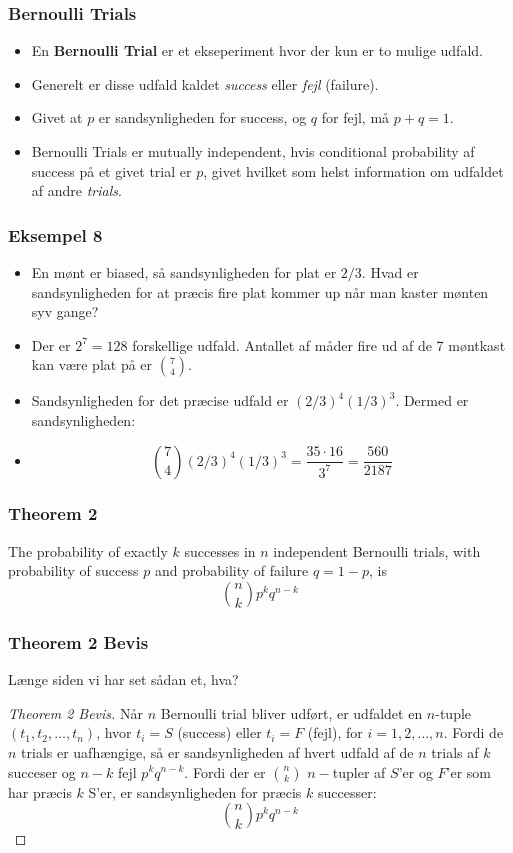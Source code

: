 \documentclass{beamer}
\begin{document}
\begin{frame}
  \frametitle{Bernoulli Trials}
 \begin{itemize}
 \item En \textbf{Bernoulli Trial} er et ekseperiment hvor der kun er to mulige udfald. 
 \item Generelt er disse udfald kaldet \textit{success} eller \textit{fejl} (failure). 
 \item Givet at $p$ er sandsynligheden for success, og $q$ for fejl, må $p + q = 1$.
 \item Bernoulli Trials er mutually independent, hvis conditional probability af success på et givet trial er $p$, givet hvilket som helst information om udfaldet af andre \textit{trials}.
 \end{itemize} 
\end{frame}

\begin{frame}
  \frametitle{Eksempel 8}
  \begin{itemize}
  \item<1-> En mønt er biased, så sandsynligheden for plat er $2/3$. Hvad er sandsynligheden for at præcis fire plat kommer up når man kaster mønten syv gange? 
  \item<2-> Der er $2^{7} = 128$  forskellige udfald. Antallet af måder fire ud af de 7 møntkast kan være plat på er $\binom{7}{4}$. 
  \item<2-> Sandsynligheden for det præcise udfald er $(2/3)^{4}(1/3)^{3}$. Dermed er sandsynligheden:
  \item<3-> \[ \binom{7}{4} (2/3)^{4} (1/3)^{3} = \frac{35 \cdot 16}{3^{7}} = \frac{560}{2187} \]
  \end{itemize}
\end{frame}

\begin{frame}
  \frametitle{Theorem 2}
  \begin{theorem}[Theorem 2]
    The probability of exactly $k$ successes in $n$ independent Bernoulli trials, with probability of success $p$ and probability of failure $q = 1 - p$, is
    \[\binom{n}{k} p^{k} q^{n-k} \]
  \end{theorem}
\end{frame}
\begin{frame}
  \frametitle{Theorem 2 Bevis}
  Længe siden vi har set sådan et, hva? 
 \begin{proof}[Theorem 2 Bevis]
   Når $n$ Bernoulli trial bliver udført, er udfaldet en $n$-tuple $(t_{1}, t_{2},\ldots, t_{n})$, hvor $t_{i} = S$ (success) eller $t_{i} = F$ (fejl), for $i = 1, 2, \ldots, n$. Fordi de $n$ trials er uafhængige, så er sandsynligheden af hvert udfald af de $n$ trials af $k$ succeser og $n-k$ fejl $p^{k}q^{n-k}$. Fordi der er $\binom{n}{k}$ $n-$tupler af $S$'er og $F$'er som har præcis $k$ S'er, er sandsynligheden for præcis $k$ successer:
   \[ \binom{n}{k}p^{k}q^{n-k} \]
 \end{proof} 
\end{frame}
\end{document}
